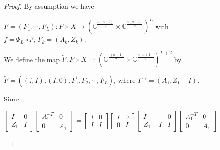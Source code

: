 \documentclass[10pt]{amsart}
\theoremstyle{remark}
\begin{document}
\begin{proof}
By assumption we have
\begin{center}
    $F = (F_1, \cdots, F_L) : P \times X \to (\mathbb{C}^{\frac{n(n-1)}{2}} \times \mathbb{C}^{\frac{n(n+1)}{2}} )^L$ with $f = \Psi_L \circ F, \, F_k =  (A_k,Z_k)$.   
\end{center}
We define the map
$\tilde F : P \times X \to (\mathbb{C}^{\frac{n(n-1)}{2}} \times \mathbb{C}^{\frac{n(n+1)}{2}} )^{L+2}$
by
 \begin{center}
  $\tilde F = ((I,I), (I,0), F^{\prime}_1, F_2, \cdots, F_L)$,  where $F_1'=(A_1, Z_1-I)$.
 \end{center}
Since
\begin{center}
    $ \left[\begin{array}{ccc} I & 0 \\ Z_1 & I\end{array}\right]\left[\begin{array}{ccc} A_1^{-T} & 0 \\ 0 & A_1\end{array}\right] = \left[\begin{array}{ccc} I & 0 \\ I & I\end{array}\right]\left[\begin{array}{ccc} I & 0 \\ 0 & I\end{array}\right] \left[\begin{array}{ccc} I & 0 \\ Z_1-I & I\end{array}\right]\left[\begin{array}{ccc} A_1^{-T} & 0 \\ 0 & A_1 \end{array}\right] $
\end{center}

\end{proof}
\end{document}

